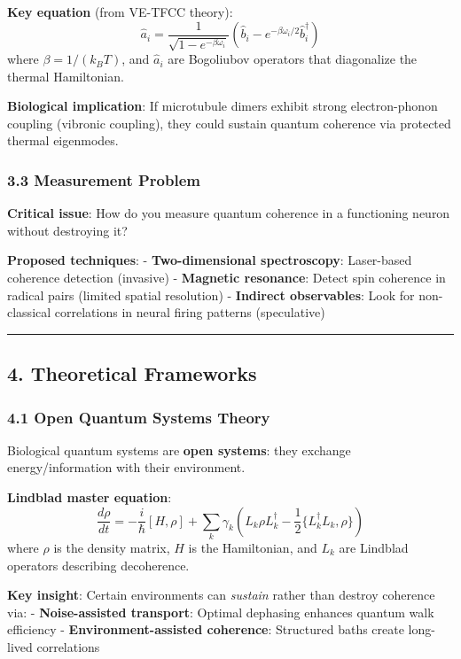 \textbf{Key equation} (from VE-TFCC theory):
\[\hat{a}_i = \frac{1}{\sqrt{1 - e^{-\beta \omega_i}}} \left( \hat{b}_i - e^{-\beta \omega_i/2} \hat{b}_i^\dagger \right)\]
where \(\beta = 1/(k_B T)\), and \(\hat{a}_i\) are Bogoliubov operators
that diagonalize the thermal Hamiltonian.

\textbf{Biological implication}: If microtubule dimers exhibit strong
electron-phonon coupling (vibronic coupling), they could sustain quantum
coherence via protected thermal eigenmodes.

\subsubsection{3.3 Measurement Problem}\label{measurement-problem}

\textbf{Critical issue}: How do you measure quantum coherence in a
functioning neuron without destroying it?

\textbf{Proposed techniques}: - \textbf{Two-dimensional spectroscopy}:
Laser-based coherence detection (invasive) - \textbf{Magnetic
resonance}: Detect spin coherence in radical pairs (limited spatial
resolution) - \textbf{Indirect observables}: Look for non-classical
correlations in neural firing patterns (speculative)

\begin{center}\rule{0.5\linewidth}{0.5pt}\end{center}

\subsection{4. Theoretical Frameworks}\label{theoretical-frameworks}

\subsubsection{4.1 Open Quantum Systems
Theory}\label{open-quantum-systems-theory}

Biological quantum systems are \textbf{open systems}: they exchange
energy/information with their environment.

\textbf{Lindblad master equation}:
\[\frac{d\rho}{dt} = -\frac{i}{\hbar}[H, \rho] + \sum_k \gamma_k \left( L_k \rho L_k^\dagger - \frac{1}{2}\{L_k^\dagger L_k, \rho\} \right)\]
where \(\rho\) is the density matrix, \(H\) is the Hamiltonian, and
\(L_k\) are Lindblad operators describing decoherence.

\textbf{Key insight}: Certain environments can \emph{sustain} rather
than destroy coherence via: - \textbf{Noise-assisted transport}: Optimal
dephasing enhances quantum walk efficiency -
\textbf{Environment-assisted coherence}: Structured baths create
long-lived correlations

